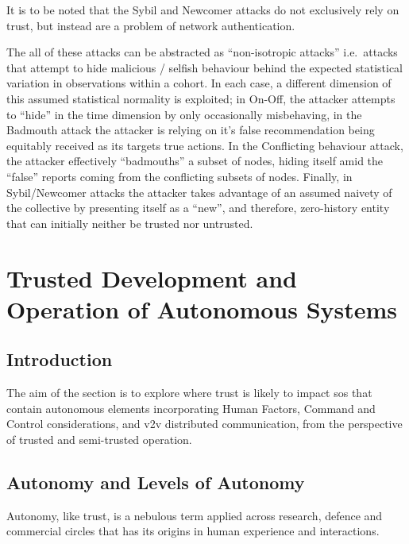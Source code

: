 It is to be noted that the Sybil and Newcomer attacks do not exclusively rely on trust, but instead are a problem of network authentication.

The all of these attacks can be abstracted as ``non-isotropic attacks'' i.e.\ attacks that attempt to hide malicious / selfish behaviour behind the expected statistical variation in observations within a cohort.
In each case, a different dimension of this assumed statistical normality is exploited; in On-Off, the attacker attempts to ``hide'' in the time dimension by only occasionally misbehaving, in the Badmouth attack the attacker is relying on it's false recommendation being equitably received as its targets true actions. 
In the Conflicting behaviour attack, the attacker effectively ``badmouths'' a subset of nodes, hiding itself amid the ``false'' reports coming from the conflicting subsets of nodes. 
Finally, in Sybil/Newcomer attacks the attacker takes advantage of an assumed naivety of the collective by presenting itself as a ``new'', and therefore, zero-history entity that can initially neither be trusted nor untrusted.


\section{Trusted Development and Operation of Autonomous Systems}\label{sec:trust_autonomy}

\subsection{Introduction}

The aim of the section is to explore where trust is likely to impact \gls{sos} that contain autonomous elements incorporating Human Factors, Command and Control considerations, and \gls{v2v} distributed communication, from the perspective of trusted and semi-trusted operation.


\subsection{Autonomy and Levels of Autonomy}

Autonomy, like trust, is a nebulous term applied across research, defence and commercial circles that has its origins in human experience and interactions. 

